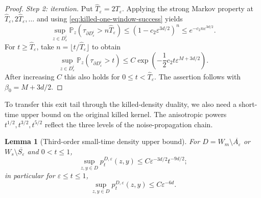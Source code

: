 \documentclass[11pt]{article}
\numberwithin{equation}{section}
\theoremstyle{plain}
\newtheorem{lemma}[theorem]{Lemma}
\theoremstyle{definition}
\theoremstyle{remark}
\newcommand{\eps}{\varepsilon}
\newcommand{\Pbb}{\mathbb P}
\begin{document}
\begin{proof}
\emph{Step 2: iteration.}
Put $\widehat T_\eps=2T_\eps$.  Applying the strong Markov property at
$\widehat T_\eps,2\widehat T_\eps,\ldots$ and using
\eqref{eq:killed-one-window-success} yields
\[
\sup_{z\in D_\eps^i}
\Pbb_z\left(\tau_{\partial D_\eps^i}>n\widehat T_\eps\right)
\le\left(1-c_2\eps^{3d/2}\right)^n
\le e^{-c_2n\eps^{3d/2}}.
\]
For $t\ge\widehat T_\eps$, take
$n=\lfloor t/\widehat T_\eps\rfloor$ to obtain
\[
\sup_{z\in D_\eps^i}\Pbb_z\left(\tau_{\partial D_\eps^i}>t\right)
\le C\exp\left(-\frac12 c_2t\eps^{M+3d/2}\right).
\]
After increasing $C$ this also holds for $0\le t<\widehat T_\eps$.
The assertion follows with $\beta_0=M+3d/2$.
\end{proof}


To transfer this exit tail through the killed-density duality,
we also need a short-time upper bound on the original killed kernel.  The
anisotropic powers $t^{1/2},t^{3/2},t^{5/2}$ reflect the three levels of the
noise-propagation chain.

\begin{lemma}[Third-order small-time density upper bound]
\label{lem:third-order-small-time-density-upper}
For $D=W_m\setminus\overline{A_\eps}$ or
$W_s\setminus\overline{S_\eps}$ and $0<t\le1$,
\[
\sup_{z,y\in D}p_t^{D,\eps}(z,y)\le C\eps^{-3d/2}t^{-9d/2};
\]
in particular for
$\eps\le t\le1$,
\[
\sup_{z,y\in D}p_t^{D,\eps}(z,y)\le C\eps^{-6d}.
\]
\end{lemma}
\end{document}
